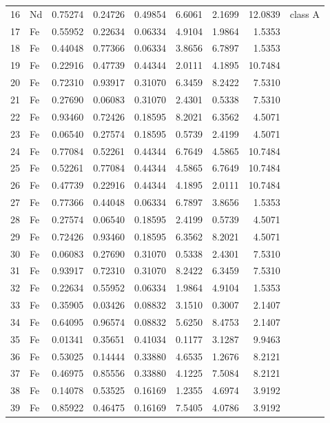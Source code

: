 \begin{longtable}{rlrrrrrrl}
16 & Nd & 0.75274 & 0.24726 & 0.49854 & 6.6061 & 2.1699 & 12.0839 & class A \\
17 & Fe & 0.55952 & 0.22634 & 0.06334 & 4.9104 & 1.9864 & 1.5353 &  \\
18 & Fe & 0.44048 & 0.77366 & 0.06334 & 3.8656 & 6.7897 & 1.5353 &  \\
19 & Fe & 0.22916 & 0.47739 & 0.44344 & 2.0111 & 4.1895 & 10.7484 &  \\
20 & Fe & 0.72310 & 0.93917 & 0.31070 & 6.3459 & 8.2422 & 7.5310 &  \\
21 & Fe & 0.27690 & 0.06083 & 0.31070 & 2.4301 & 0.5338 & 7.5310 &  \\
22 & Fe & 0.93460 & 0.72426 & 0.18595 & 8.2021 & 6.3562 & 4.5071 &  \\
23 & Fe & 0.06540 & 0.27574 & 0.18595 & 0.5739 & 2.4199 & 4.5071 &  \\
24 & Fe & 0.77084 & 0.52261 & 0.44344 & 6.7649 & 4.5865 & 10.7484 &  \\
25 & Fe & 0.52261 & 0.77084 & 0.44344 & 4.5865 & 6.7649 & 10.7484 &  \\
26 & Fe & 0.47739 & 0.22916 & 0.44344 & 4.1895 & 2.0111 & 10.7484 &  \\
27 & Fe & 0.77366 & 0.44048 & 0.06334 & 6.7897 & 3.8656 & 1.5353 &  \\
28 & Fe & 0.27574 & 0.06540 & 0.18595 & 2.4199 & 0.5739 & 4.5071 &  \\
29 & Fe & 0.72426 & 0.93460 & 0.18595 & 6.3562 & 8.2021 & 4.5071 &  \\
30 & Fe & 0.06083 & 0.27690 & 0.31070 & 0.5338 & 2.4301 & 7.5310 &  \\
31 & Fe & 0.93917 & 0.72310 & 0.31070 & 8.2422 & 6.3459 & 7.5310 &  \\
32 & Fe & 0.22634 & 0.55952 & 0.06334 & 1.9864 & 4.9104 & 1.5353 &  \\
33 & Fe & 0.35905 & 0.03426 & 0.08832 & 3.1510 & 0.3007 & 2.1407 &  \\
34 & Fe & 0.64095 & 0.96574 & 0.08832 & 5.6250 & 8.4753 & 2.1407 &  \\
35 & Fe & 0.01341 & 0.35651 & 0.41034 & 0.1177 & 3.1287 & 9.9463 &  \\
36 & Fe & 0.53025 & 0.14444 & 0.33880 & 4.6535 & 1.2676 & 8.2121 &  \\
37 & Fe & 0.46975 & 0.85556 & 0.33880 & 4.1225 & 7.5084 & 8.2121 &  \\
38 & Fe & 0.14078 & 0.53525 & 0.16169 & 1.2355 & 4.6974 & 3.9192 &  \\
39 & Fe & 0.85922 & 0.46475 & 0.16169 & 7.5405 & 4.0786 & 3.9192 &  \\

\end{longtable}
